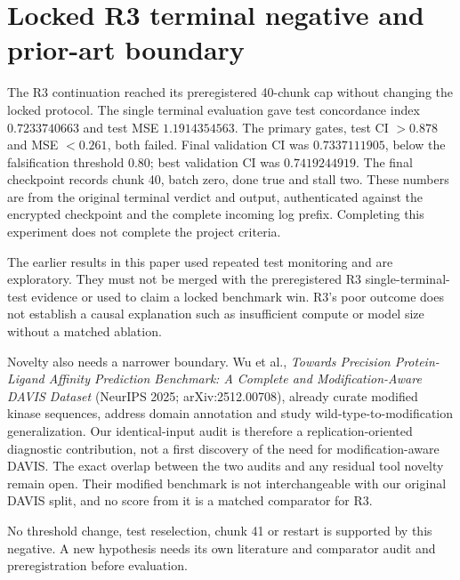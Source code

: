 \documentclass[11pt]{article}
\begin{document}
\section{Locked R3 terminal negative and prior-art boundary}
The R3 continuation reached its preregistered 40-chunk cap without changing the locked protocol. The single terminal evaluation gave test concordance index $0.7233740663$ and test MSE $1.1914354563$. The primary gates, test CI $>0.878$ and MSE $<0.261$, both failed. Final validation CI was $0.7337111905$, below the falsification threshold $0.80$; best validation CI was $0.7419244919$. The final checkpoint records chunk 40, batch zero, done true and stall two. These numbers are from the original terminal verdict and output, authenticated against the encrypted checkpoint and the complete incoming log prefix. Completing this experiment does not complete the project criteria.

The earlier results in this paper used repeated test monitoring and are exploratory. They must not be merged with the preregistered R3 single-terminal-test evidence or used to claim a locked benchmark win. R3's poor outcome does not establish a causal explanation such as insufficient compute or model size without a matched ablation.

Novelty also needs a narrower boundary. Wu et al., \emph{Towards Precision Protein-Ligand Affinity Prediction Benchmark: A Complete and Modification-Aware DAVIS Dataset} (NeurIPS 2025; arXiv:2512.00708), already curate modified kinase sequences, address domain annotation and study wild-type-to-modification generalization. Our identical-input audit is therefore a replication-oriented diagnostic contribution, not a first discovery of the need for modification-aware DAVIS. The exact overlap between the two audits and any residual tool novelty remain open. Their modified benchmark is not interchangeable with our original DAVIS split, and no score from it is a matched comparator for R3.

No threshold change, test reselection, chunk 41 or restart is supported by this negative. A new hypothesis needs its own literature and comparator audit and preregistration before evaluation.
\end{document}
